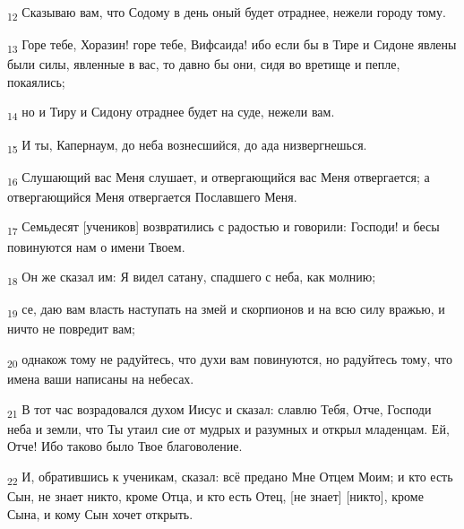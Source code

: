 \begin{tcolorbox}
\textsubscript{12} Сказываю вам, что Содому в день оный будет отраднее, нежели городу тому.
\end{tcolorbox}
\begin{tcolorbox}
\textsubscript{13} Горе тебе, Хоразин! горе тебе, Вифсаида! ибо если бы в Тире и Сидоне явлены были силы, явленные в вас, то давно бы они, сидя во вретище и пепле, покаялись;
\end{tcolorbox}
\begin{tcolorbox}
\textsubscript{14} но и Тиру и Сидону отраднее будет на суде, нежели вам.
\end{tcolorbox}
\begin{tcolorbox}
\textsubscript{15} И ты, Капернаум, до неба вознесшийся, до ада низвергнешься.
\end{tcolorbox}
\begin{tcolorbox}
\textsubscript{16} Слушающий вас Меня слушает, и отвергающийся вас Меня отвергается; а отвергающийся Меня отвергается Пославшего Меня.
\end{tcolorbox}
\begin{tcolorbox}
\textsubscript{17} Семьдесят [учеников] возвратились с радостью и говорили: Господи! и бесы повинуются нам о имени Твоем.
\end{tcolorbox}
\begin{tcolorbox}
\textsubscript{18} Он же сказал им: Я видел сатану, спадшего с неба, как молнию;
\end{tcolorbox}
\begin{tcolorbox}
\textsubscript{19} се, даю вам власть наступать на змей и скорпионов и на всю силу вражью, и ничто не повредит вам;
\end{tcolorbox}
\begin{tcolorbox}
\textsubscript{20} однакож тому не радуйтесь, что духи вам повинуются, но радуйтесь тому, что имена ваши написаны на небесах.
\end{tcolorbox}
\begin{tcolorbox}
\textsubscript{21} В тот час возрадовался духом Иисус и сказал: славлю Тебя, Отче, Господи неба и земли, что Ты утаил сие от мудрых и разумных и открыл младенцам. Ей, Отче! Ибо таково было Твое благоволение.
\end{tcolorbox}
\begin{tcolorbox}
\textsubscript{22} И, обратившись к ученикам, сказал: всё предано Мне Отцем Моим; и кто есть Сын, не знает никто, кроме Отца, и кто есть Отец, [не знает] [никто], кроме Сына, и кому Сын хочет открыть.
\end{tcolorbox}
